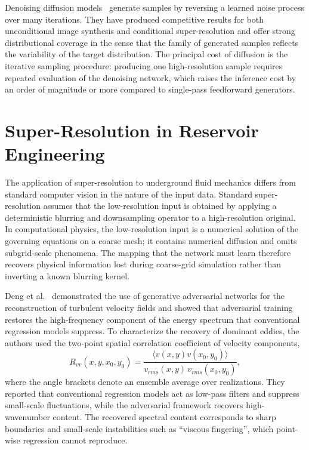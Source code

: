 Denoising diffusion models~\cite{saharia2021image, rombach2022high} generate samples by reversing a learned noise process over many iterations. They have produced competitive results for both unconditional image synthesis and conditional super-resolution and offer strong distributional coverage in the sense that the family of generated samples reflects the variability of the target distribution. The principal cost of diffusion is the iterative sampling procedure: producing one high-resolution sample requires repeated evaluation of the denoising network, which raises the inference cost by an order of magnitude or more compared to single-pass feedforward generators.


\section{Super-Resolution in Reservoir Engineering}
\label{sec:physics_sr}

The application of super-resolution to underground fluid mechanics differs from standard computer vision in the nature of the input data. Standard super-resolution assumes that the low-resolution input is obtained by applying a deterministic blurring and downsampling operator to a high-resolution original. In computational physics, the low-resolution input is a numerical solution of the governing equations on a coarse mesh; it contains numerical diffusion and omits subgrid-scale phenomena. The mapping that the network must learn therefore recovers physical information lost during coarse-grid simulation rather than inverting a known blurring kernel.

Deng et al.~\cite{deng2019superresolution} demonstrated the use of generative adversarial networks for the reconstruction of turbulent velocity fields and showed that adversarial training restores the high-frequency component of the energy spectrum that conventional regression models suppress. To characterize the recovery of dominant eddies, the authors used the two-point spatial correlation coefficient of velocity components,
\begin{equation}
    R_{vv}(x, y, x_0, y_0) = \frac{\langle v(x, y) v(x_0, y_0) \rangle}{v_{rms}(x, y)\, v_{rms}(x_0, y_0)},
\end{equation}
where the angle brackets denote an ensemble average over realizations. They reported that conventional regression models act as low-pass filters and suppress small-scale fluctuations, while the adversarial framework recovers high-wavenumber content. The recovered spectral content corresponds to sharp boundaries and small-scale instabilities such as \enquote{viscous fingering}, which point-wise regression cannot reproduce.

